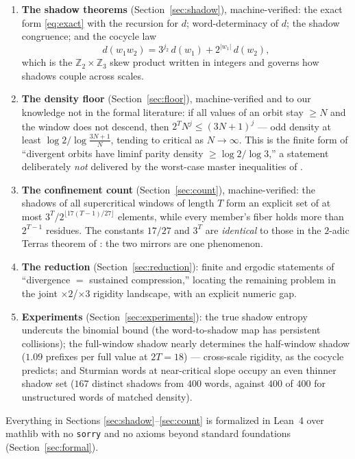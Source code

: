 \documentclass[11pt]{article}
\newcommand{\Z}{\mathbb{Z}}
\newcommand{\Ztwo}{\Z_2}
\newcommand{\Zthree}{\Z_3}
\newcommand{\code}[1]{\texttt{#1}}
\begin{document}
\begin{enumerate}
\item \textbf{The shadow theorems} (Section~\ref{sec:shadow}),
machine-verified: the exact form \eqref{eq:exact} with the recursion
for $d$; word-determinacy of $d$; the shadow congruence; and the
cocycle law
\[
d(w_1 w_2) = 3^{j_2}\, d(w_1) + 2^{|w_1|}\, d(w_2),
\]
which is the $\Ztwo \times \Zthree$ skew product written in integers
and governs how shadows couple across scales.
\item \textbf{The density floor} (Section~\ref{sec:floor}),
machine-verified and to our knowledge not in the formal literature:
if all values of an orbit stay $\ge N$ and the window does not descend,
then $2^T N^{j} \le (3N+1)^{j}$ --- odd density at least
$\log 2 / \log\frac{3N+1}{N}$, tending to critical as $N \to \infty$.
This is the finite form of ``divergent orbits have liminf parity
density $\ge \log 2/\log 3$,'' a statement deliberately \emph{not}
delivered by the worst-case master inequalities of \cite{companion}.
\item \textbf{The confinement count} (Section~\ref{sec:count}),
machine-verified: the shadows of all supercritical windows of length
$T$ form an explicit set of at most $3^T/2^{\lfloor 17(T-1)/27\rfloor}$
elements, while every member's fiber holds more than $2^{T-1}$
residues. The constants $17/27$ and $3^T$ are \emph{identical} to those
in the $2$-adic Terras theorem of \cite{companion}: the two mirrors are
one phenomenon.
\item \textbf{The reduction} (Section~\ref{sec:reduction}): finite and
ergodic statements of ``divergence $=$ sustained compression,''
locating the remaining problem in the joint $\times 2$/$\times 3$
rigidity landscape, with an explicit numeric gap.
\item \textbf{Experiments} (Section~\ref{sec:experiments}): the true
shadow entropy undercuts the binomial bound (the word-to-shadow map has
persistent collisions); the full-window shadow nearly determines the
half-window shadow ($1.09$ prefixes per full value at $2T = 18$) ---
cross-scale rigidity, as the cocycle predicts; and Sturmian words at
near-critical slope occupy an even thinner shadow set ($167$ distinct
shadows from $400$ words, against $400$ of $400$ for unstructured words
of matched density).
\end{enumerate}

Everything in Sections \ref{sec:shadow}--\ref{sec:count} is formalized
in Lean~4 over \textsf{mathlib} \cite{mathlib} with no \code{sorry} and
no axioms beyond standard foundations (Section~\ref{sec:formal}).
\end{document}
